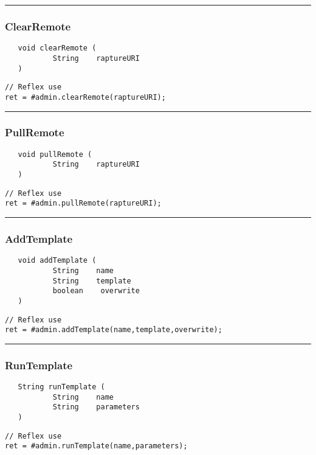 \rule{15cm}{2pt}
\subsubsection{ClearRemote}
\label{Api:ClearRemote}
\begin{verbatim}
   void clearRemote (
           String    raptureURI
   )
\end{verbatim}
\begin{lstlisting}[language=reflex]
// Reflex use
ret = #admin.clearRemote(raptureURI);
\end{lstlisting}



\rule{15cm}{2pt}
\subsubsection{PullRemote}
\label{Api:PullRemote}
\begin{verbatim}
   void pullRemote (
           String    raptureURI
   )
\end{verbatim}
\begin{lstlisting}[language=reflex]
// Reflex use
ret = #admin.pullRemote(raptureURI);
\end{lstlisting}



\rule{15cm}{2pt}
\subsubsection{AddTemplate}
\label{Api:AddTemplate}
\begin{verbatim}
   void addTemplate (
           String    name
           String    template
           boolean    overwrite
   )
\end{verbatim}
\begin{lstlisting}[language=reflex]
// Reflex use
ret = #admin.addTemplate(name,template,overwrite);
\end{lstlisting}



\rule{15cm}{2pt}
\subsubsection{RunTemplate}
\label{Api:RunTemplate}
\begin{verbatim}
   String runTemplate (
           String    name
           String    parameters
   )
\end{verbatim}
\begin{lstlisting}[language=reflex]
// Reflex use
ret = #admin.runTemplate(name,parameters);
\end{lstlisting}



